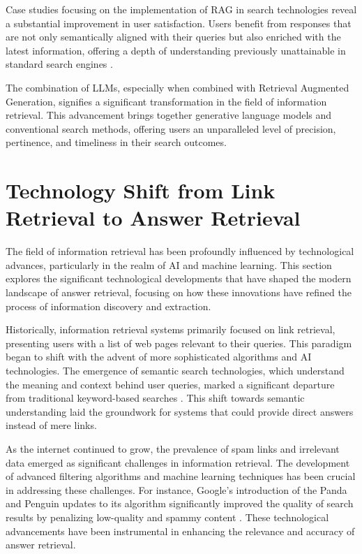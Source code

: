 \documentclass{article}
\begin{document}
Case studies focusing on the implementation of RAG in search technologies reveal a substantial improvement in user satisfaction. Users benefit from responses that are not only semantically aligned with their queries but also enriched with the latest information, offering a depth of understanding previously unattainable in standard search engines \citep{gao2023retrieval}.

The combination of LLMs, especially when combined with Retrieval Augmented Generation, signifies a significant transformation in the field of information retrieval. This advancement brings together generative language models and conventional search methods, offering users an unparalleled level of precision, pertinence, and timeliness in their search outcomes.

\section{Technology Shift from Link Retrieval to Answer Retrieval}

The field of information retrieval has been profoundly influenced by technological advances, particularly in the realm of AI and machine learning. This section explores the significant technological developments that have shaped the modern landscape of answer retrieval, focusing on how these innovations have refined the process of information discovery and extraction.

Historically, information retrieval systems primarily focused on link retrieval, presenting users with a list of web pages relevant to their queries. This paradigm began to shift with the advent of more sophisticated algorithms and AI technologies. The emergence of semantic search technologies, which understand the meaning and context behind user queries, marked a significant departure from traditional keyword-based searches \citep{schutze2008introduction}. This shift towards semantic understanding laid the groundwork for systems that could provide direct answers instead of mere links.

As the internet continued to grow, the prevalence of spam links and irrelevant data emerged as significant challenges in information retrieval. The development of advanced filtering algorithms and machine learning techniques has been crucial in addressing these challenges. For instance, Google's introduction of the Panda and Penguin updates to its algorithm significantly improved the quality of search results by penalizing low-quality and spammy content \citep{patil2021comparative}. These technological advancements have been instrumental in enhancing the relevance and accuracy of answer retrieval.
\end{document}
